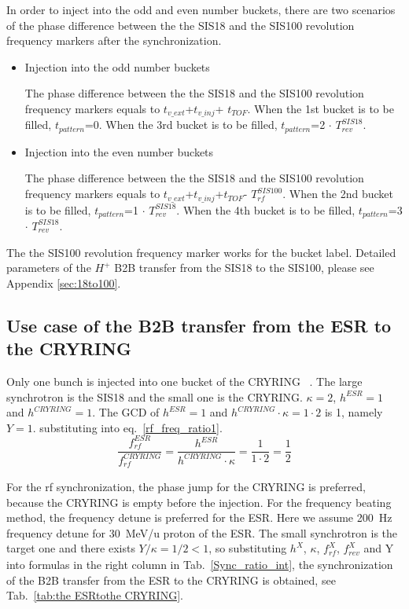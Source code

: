 In order to inject into the odd and even number buckets, there are two scenarios of the phase difference between the the SIS18 and the SIS100 revolution frequency markers after the synchronization.
\begin{itemize}
	\item Injection into the odd number buckets
		
		The phase difference between the the SIS18 and the SIS100 revolution frequency markers equals to $t_{v\_ext}$+$t_{v\_inj}$+ $t_{TOF}$. When the 1st bucket is to be filled, $t_{pattern}$=0. When the 3rd bucket is to be filled, $t_{pattern}$=2 $\cdot$ $T_{\mathit{rev}}^{\mathit{SIS18}}$. 
	\item Injection into the even number buckets
	
		The phase difference between the the SIS18 and the SIS100 revolution frequency markers equals to $t_{v\_ext}$+$t_{v\_inj}$+$t_{TOF}$- $T_{\mathit{rf}}^{\mathit{SIS100}}$. When the 2nd bucket is to be filled, $t_{pattern}$=1 $\cdot$ $T_{\mathit{rev}}^{\mathit{SIS18}}$. When the 4th bucket is to be filled, $t_{pattern}$=3 $\cdot$ $T_{\mathit{rev}}^{\mathit{SIS18}}$. 

\end{itemize}

The the SIS100 revolution frequency marker works for the bucket label. Detailed parameters of the $H^{+}$ B2B transfer from the SIS18 to the SIS100, please see Appendix \ref{sec:18to100}.
\subsection{Use case of the B2B transfer from the ESR to the CRYRING}
Only one bunch is injected into one bucket of the CRYRING ~\cite{herfurth_low_2013, lestinsky_cryring_2015}. The large synchrotron is the SIS18 and the small one is the CRYRING. $\kappa=2$, $h^{\mathit{ESR}}=1$ and $h^{\mathit{CRYRING}}=1$. The GCD of $h^{\mathit{ESR}}=1$ and $h^{\mathit{CRYRING}} \cdot \kappa=1\cdot 2$ is 1, namely $Y=1$. substituting into eq.~\ref{rf_freq_ratio1}. 
\begin{equation}
\frac{f_{\mathit{rf}}^{\mathit{ESR}}}{f_{\mathit{rf}}^{\mathit{CRYRING}}}= \frac {h^{\mathit{ESR}}}{h^{\mathit{CRYRING}} \cdot \kappa}= \frac{1}{1 \cdot 2}=\frac{1}{2}
\end{equation}

For the rf synchronization, the phase jump for the CRYRING is preferred, because the CRYRING is empty before the injection. For the frequency beating method, the frequency detune is preferred for the ESR. Here we assume \SI{200}{Hz} frequency detune for \SI{30}{MeV/\atomicmassunit} proton of the ESR. The small synchrotron is the target one and there exists $Y/\kappa=1/2<1$, so substituting $h^X$, $\kappa$, $f_{\mathit{rf}}^{X}$, $f_{\mathit{rev}}^{X}$ and Y into formulas in the right column in Tab.~\ref{Sync_ratio_int}, the synchronization of the B2B transfer from the ESR to the CRYRING is obtained, see Tab.~\ref{tab:the ESRtothe CRYRING}.

